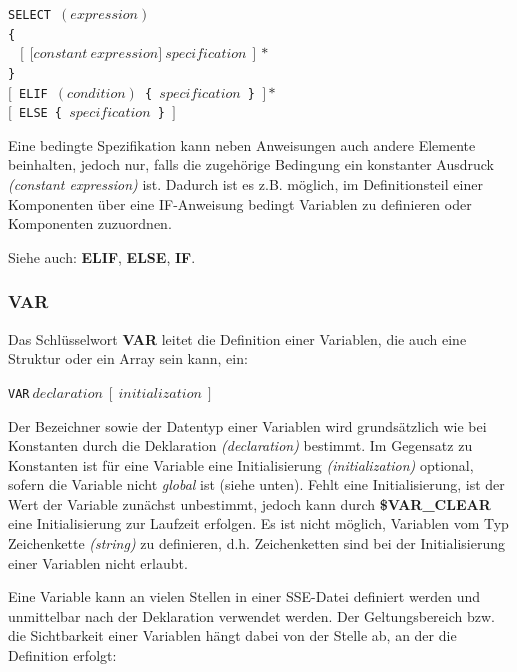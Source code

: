 \documentclass{scrartcl}
\begin{document}
\vspace{10pt}
\indent \texttt{SELECT~$(expression)$\\
\indent \{\\
\indent $~~~[~\textbf{[}constant~expression\textbf{]}~specification~]*$\\
\indent \}}\\
\indent \texttt{$[$~ELIF~$(condition)$ \{ $specification$ \}~$]*$}\\
\indent \texttt{$[$~ELSE \{ $specification$ \}~$]$}

\vspace{10pt}
\noindent Eine bedingte Spezifikation kann neben Anweisungen auch andere Elemente beinhalten, jedoch nur, falls die zugehörige Bedingung ein konstanter Ausdruck \textit{(constant expression)} ist. Dadurch ist es z.B. möglich, im Definitionsteil einer Komponenten über eine IF-Anweisung bedingt Variablen zu definieren oder Komponenten zuzuordnen.

\vspace{10pt}
\noindent Siehe auch: \textbf{ELIF}, \textbf{ELSE}, \textbf{IF}.

\subsubsection{VAR}

\noindent Das Schlüsselwort \textbf{VAR} leitet die Definition einer Variablen, die auch eine Struktur oder ein Array sein kann, ein:

\vspace{10pt}
\indent \texttt{VAR$~declaration~[~initialization~]$}

\vspace{10pt}
\noindent Der Bezeichner sowie der Datentyp einer Variablen wird grundsätzlich wie bei Konstanten durch die Deklaration \textit{(declaration)} bestimmt. Im Gegensatz zu Konstanten ist für eine Variable eine Initialisierung \textit{(initialization)} optional, sofern die Variable nicht \textit{global} ist (siehe unten). Fehlt eine Initialisierung, ist der Wert der Variable zunächst unbestimmt, jedoch kann durch \textbf{\$VAR\_CLEAR} eine Initialisierung zur Laufzeit erfolgen. Es ist nicht möglich, Variablen vom Typ Zeichenkette \textit{(string)} zu definieren, d.h. Zeichenketten sind bei der Initialisierung einer Variablen nicht erlaubt.

\vspace{10pt}
\noindent Eine Variable kann an vielen Stellen in einer SSE-Datei definiert werden und unmittelbar nach der Deklaration verwendet werden. Der Geltungsbereich bzw. die Sichtbarkeit einer Variablen hängt dabei von der Stelle ab, an der die Definition erfolgt:
\end{document}
